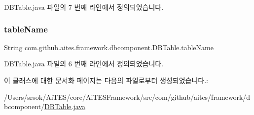D\+B\+Table.\+java 파일의 7 번째 라인에서 정의되었습니다.

\mbox{\label{classcom_1_1github_1_1aites_1_1framework_1_1dbcomponent_1_1_d_b_table_a13baee6ab61eeea3b604d2a7b99b11e7}} 
\subsubsection{\texorpdfstring{table\+Name}{tableName}}
{\footnotesize\ttfamily String com.\+github.\+aites.\+framework.\+dbcomponent.\+D\+B\+Table.\+table\+Name\hspace{0.3cm}{\ttfamily [private]}}



D\+B\+Table.\+java 파일의 6 번째 라인에서 정의되었습니다.



이 클래스에 대한 문서화 페이지는 다음의 파일로부터 생성되었습니다.\+:\begin{DoxyCompactItemize}
\item 
/\+Users/srsok/\+Ai\+T\+E\+S/core/\+Ai\+T\+E\+S\+Framework/src/com/github/aites/framework/dbcomponent/\mbox{\hyperlink{_d_b_table_8java}{D\+B\+Table.\+java}}\end{DoxyCompactItemize}

